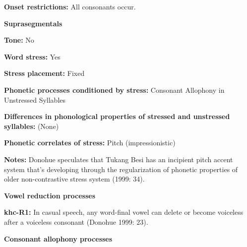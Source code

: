 \begin{styleBody}
\textbf{Onset restrictions: }All consonants occur.
\end{styleBody}

\begin{styleBody}
\textbf{Suprasegmentals}
\end{styleBody}

\begin{styleBody}
\textbf{Tone:} No
\end{styleBody}

\begin{styleBody}
\textbf{Word stress:} Yes
\end{styleBody}

\begin{styleBody}
\textbf{Stress placement:} Fixed
\end{styleBody}

\begin{styleBody}
\textbf{Phonetic processes conditioned by stress:} Consonant Allophony in Unstressed Syllables
\end{styleBody}

\begin{styleBody}
\textbf{Differences in phonological properties of stressed and unstressed syllables:} (None)
\end{styleBody}

\begin{styleBody}
\textbf{Phonetic correlates of stress: }Pitch (impressionistic)
\end{styleBody}

\begin{styleBody}
\textbf{Notes:} Donohue speculates that Tukang Besi has an incipient pitch accent system that’s developing through the regularization of phonetic properties of older non-contrastive stress system (1999: 34).
\end{styleBody}

\begin{styleBody}
\textbf{Vowel reduction processes}
\end{styleBody}

\begin{styleBody}
\textbf{khc-R1:} In casual speech, any word-final vowel can delete or become voiceless after a voiceless consonant (Donohue 1999: 23).
\end{styleBody}

\begin{styleBody}
\textbf{Consonant allophony processes}
\end{styleBody}

